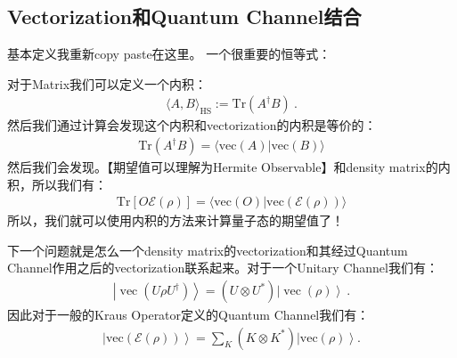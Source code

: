 
\subsection{Vectorization和Quantum Channel结合}

\bigskip
{}

基本定义我重新copy paste在这里。
一个很重要的恒等式：


\bigskip
{}

对于Matrix我们可以定义一个内积：
\begin{align}
  \langle A,B\rangle_{\mathrm{HS}}:=\mathrm{Tr}\left(A^{\dagger}B\right)\mathrm{~.}
\end{align}
然后我们通过计算会发现这个内积和vectorization的内积是等价的：
\begin{align}
  \mathrm{Tr}\left(A^\dagger B\right)=\langle\mathrm{vec}(A)|\mathrm{vec}(B)\rangle
\end{align}
然后我们会发现。【期望值可以理解为Hermite Observable】和density matrix的内积，所以我们有：
\begin{align}
  \mathrm{Tr}{\left[O\mathcal{E}(\rho)\right]}=\langle\mathrm{vec}(O)|\mathrm{vec}(\mathcal{E}(\rho))\rangle
\end{align}
所以，我们就可以使用内积的方法来计算量子态的期望值了！

\bigskip
{}

下一个问题就是怎么一个density matrix的vectorization和其经过Quantum Channel作用之后的vectorization联系起来。对于一个Unitary Channel我们有：
\begin{align}
  \left|\operatorname{vec}(U\rho U^\dagger)\right\rangle=\left(U\otimes U^*\right)\left|\operatorname{vec}(\rho)\right\rangle\mathrm{~.}
\end{align}
因此对于一般的Kraus Operator定义的Quantum Channel我们有：
\begin{align}
  \left|\mathrm{vec}(\mathcal{E}(\rho))\right\rangle=\sum_K\left(K\otimes K^*\right)\left|\mathrm{vec}(\rho)\right\rangle.
\end{align}




